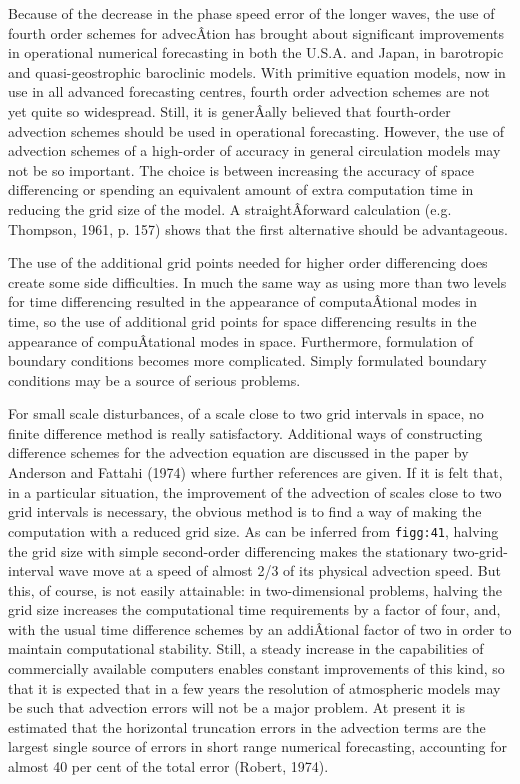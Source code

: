 Because of the decrease in the phase speed error of the longer waves,
the use of fourth order schemes for advecÂ­tion has brought about
significant improvements in operational numerical forecasting in both
the U.S.A. and Japan, in barotropic and quasi-geostrophic baroclinic
models. With primitive equation models, now in use in all advanced
forecasting centres, fourth order advection schemes are not yet quite so
widespread. Still, it is generÂ­ally believed that fourth-order advection
schemes should be used in operational forecasting. However, the use of
advection schemes of a high-order of accuracy in general circulation
models may not be so important. The choice is between increasing the
accuracy of space differencing or spending an equivalent amount of extra
computation time in reducing the grid size of the model. A
straightÂ­forward calculation (e.g. Thompson, 1961, p. 157) shows that
the first alternative should be advantageous.

The use of the additional grid points needed for higher order
differencing does create some side difficulties. In much the same way as
using more than two levels for time differencing resulted in the
appearance of computaÂ­tional modes in time, so the use of additional
grid points for space differencing results in the appearance of
compuÂ­tational modes in space. Furthermore, formulation of boundary
conditions becomes more complicated. Simply formulated boundary
conditions may be a source of serious problems.

For small scale disturbances, of a scale close to two grid intervals in
space, no finite difference method is really satisfactory. Additional
ways of constructing difference schemes for the advection equation are
discussed in the paper by Anderson and Fattahi (1974) where further
references are given. If it is felt that, in a particular situation, the
improvement of the advection of scales close to two grid intervals is
necessary, the obvious method is to find a way of making the computation
with a reduced grid size. As can be inferred from \texttt{figg:41},
halving the grid size with simple second-order differencing makes the
stationary two-grid-interval wave move at a speed of almost 2/3 of its
physical advection speed. But this, of course, is not easily attainable:
in two-dimensional problems, halving the grid size increases the
computational time requirements by a factor of four, and, with the usual
time difference schemes by an addiÂ­tional factor of two in order to
maintain computational stability. Still, a steady increase in the
capabilities of commercially available computers enables constant
improvements of this kind, so that it is expected that in a few years
the resolution of atmospheric models may be such that advection errors
will not be a major problem. At present it is estimated that the
horizontal truncation errors in the advection terms are the largest
single source of errors in short range numerical forecasting, accounting
for almost 40 per cent of the total error (Robert, 1974).

